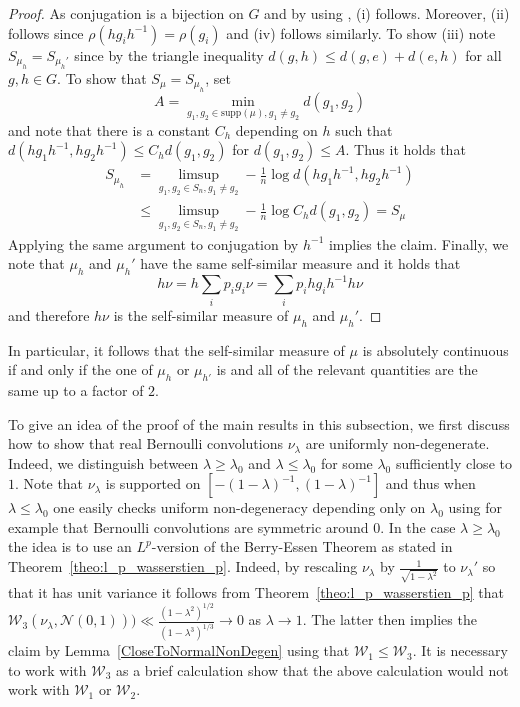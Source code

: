 \documentclass[10pt, english,oneside,reqno]{amsart}
\theoremstyle{plain}
\theoremstyle{remark}
\numberwithin{equation}{section}
\numberwithin{figure}{section}
\begin{document}
\begin{proof}
    As conjugation is a bijection on $G$ and by using \cite[Lemma 6.8]{HochmanSolomyak2017}, (i) follows. Moreover, (ii) follows since $\rho(hg_ih^{-1}) = \rho(g_i)$ and (iv) follows similarly. To show (iii) note $S_{\mu_h} = S_{\mu_h'}$ since by the triangle inequality $d(g,h) \leq d(g,e) + d(e,h)$ for all $g,h \in G$. To show that $S_{\mu} = S_{\mu_h}$, set $$A = \min_{g_1, g_2 \in \mathrm{supp}(\mu), g_1 \neq g_2} d(g_1, g_2)$$ and note that there is a constant $C_h$ depending on $h$ such that $d(hg_1h^{-1}, hg_2h^{-1}) \leq C_h d(g_1, g_2)$ for $d(g_1, g_2) \leq A $. Thus it holds that 
    \begin{align*}
        S_{\mu_h} &= \limsup_{g_1,g_2 \in S_n, g_1 \neq g_2} -\frac{1}{n}\log d(hg_1h^{-1}, hg_2h^{-1}) \\ &\leq \limsup_{g_1,g_2 \in S_n, g_1 \neq g_2} -\frac{1}{n}\log C_h d(g_1, g_2) = S_{\mu}
    \end{align*}
    Applying the same argument to conjugation by $h^{-1}$ implies the claim. Finally, we note that $\mu_h$ and $\mu_h'$ have the same self-similar measure and it holds that $$h\nu = h\sum_i p_i g_i \nu = \sum_i p_i hg_i h^{-1} h\nu$$ and therefore $h\nu$ is the self-similar measure of $\mu_h$ and $\mu_h'$.
\end{proof}
 
In particular, it follows that the self-similar measure of $\mu$ is absolutely continuous if and only if the one of $\mu_h$ or $\mu_{h'}$ is and all of the relevant quantities are the same up to a factor of $2$. 

To give an idea of the proof of the main results in this subsection, we first discuss how to show that real Bernoulli convolutions $\nu_{\lambda}$ are uniformly non-degenerate. Indeed, we distinguish between $\lambda \geq \lambda_0$ and $\lambda \leq \lambda_0$ for some $\lambda_0$ sufficiently close to $1$. Note that $\nu_{\lambda}$ is supported on $[-(1-\lambda)^{-1}, (1-\lambda)^{-1}]$ and thus when $\lambda \leq \lambda_0$ one easily checks uniform non-degeneracy depending only on $\lambda_0$ using for example that Bernoulli convolutions are symmetric around $0$. In the case $\lambda \geq \lambda_0$ the idea is to use an $L^p$-version of the Berry-Essen Theorem as stated in Theorem~\ref{theo:l_p_wasserstien_p}. Indeed, by rescaling $\nu_{\lambda}$ by $\frac{1}{\sqrt{1-\lambda^2}}$ to $\nu_{\lambda}'$ so that it has unit variance it follows from Theorem~\ref{theo:l_p_wasserstien_p} that $\mathcal{W}_3(\nu_{\lambda}, \mathcal{N}(0,1))) \ll \frac{(1-\lambda^2)^{1/2}}{(1-\lambda^3)^{1/3}} \to 0$ as $\lambda \to 1$. The latter then implies the claim by Lemma~\ref{CloseToNormalNonDegen} using that $\mathcal{W}_1 \leq \mathcal{W}_3$. It is necessary to work with $\mathcal{W}_3$ as a brief calculation show that the above calculation would not work with $\mathcal{W}_1$ or $\mathcal{W}_2$.
\end{document}
